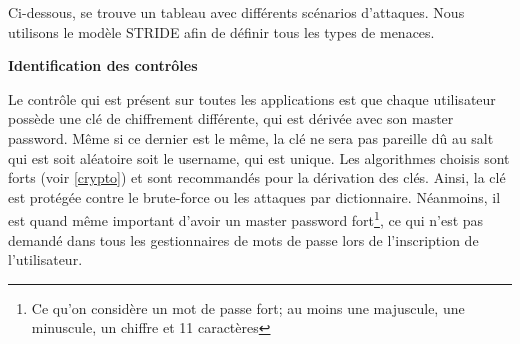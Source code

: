 Ci-dessous, se trouve un tableau avec différents scénarios d'attaques. Nous utilisons le modèle STRIDE afin de définir tous les types de menaces. 
\begin{table}[H]
	\centering
	\caption{Scénarios et types d'attaques possibles sur M5}
\end{table}

\textbf{Identification des contrôles}

Le contrôle qui est présent sur toutes les applications est que chaque utilisateur possède une clé de chiffrement différente, qui est dérivée avec son master password. Même si ce dernier est le même, la clé ne sera pas pareille dû au salt qui est soit aléatoire soit le username, qui est unique. Les algorithmes choisis sont forts (voir \ref{crypto}) et sont recommandés pour la dérivation des clés. Ainsi, la clé est protégée contre le brute-force ou les attaques par dictionnaire. Néanmoins, il est quand même important d'avoir un master password fort\footnote{Ce qu'on considère un mot de passe fort; au moins une majuscule, une minuscule, un chiffre et 11 caractères}, ce qui n'est pas demandé dans tous les gestionnaires de mots de passe lors de l'inscription de l'utilisateur.

